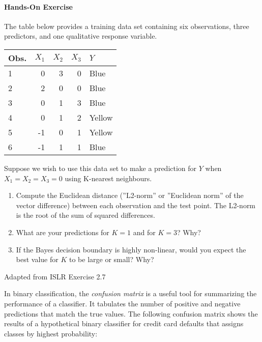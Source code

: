 \begin{tcolorbox}[colback=code]
\paragraph*{Hands-On Exercise} 

The table below provides a training data set containing six observations, three predictors, and one qualitative response variable.\\ 
\vspace{.5\baselineskip}
\begin{center}
\footnotesize
\renewcommand{\arraystretch}{1.1}
\begin{tabular}{l|r|r|r|l} \hline
Obs. & $X_1$ & $X_2$ & $X_3$ & $Y$ \\ \hline
1 & 0 & 3 & 0 & Blue \\
2 & 2 & 0 & 0 & Blue \\
3 & 0 & 1 & 3 & Blue \\
4 & 0 & 1 & 2 & Yellow \\
5 & -1 & 0 & 1 & Yellow \\
6 & -1 & 1 & 1 & Blue \\ \hline
\end{tabular}
\end{center}

\vspace{.5\baselineskip}
Suppose we wish to use this data set to make a prediction for $Y$ when $X_1=X_2=X_3=0$ using K-nearest neighbours.
\vspace{.5\baselineskip}
\begin{enumerate}
  \item Compute the Euclidean distance (''L2-norm'' or ''Euclidean norm'' of the vector difference) between each observation and the test point. The L2-norm is the root of the sum of squared differences.
  \item What are your predictions for $K=1$ and for $K=3$? Why?
  \item If the Bayes decision boundary is highly non-linear, would you expect the best value for $K$ to be large or small? Why?
\end{enumerate}

\vspace{.5\baselineskip}\scriptsize Adapted from ISLR Exercise 2.7
\end{tcolorbox}

In binary classification, the \emph{confusion matrix} is a useful tool for summarizing the performance of a classifier. It tabulates the number of positive and negative predictions that match the true values. The following confusion matrix shows the results of a hypothetical binary classifier for credit card defaults that assigns classes by highest probability:

